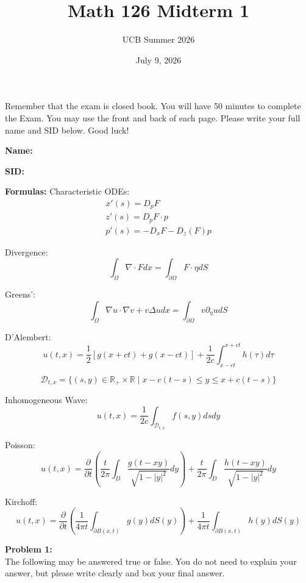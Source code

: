 \documentclass{article}
\newcommand{\R}{{\mathbb{R}}}
\newcommand{\pd}{\partial}
\begin{document}
\title{Math 126 Midterm 1}
\author{UCB Summer 2026}
\date{July 9, 2026}
\maketitle

Remember that the exam is closed book. You will have 50 minutes to complete the Exam. You may use the front and back of each page. Please write your full name and SID below. Good luck!


\textbf{Name:} 

\vspace{0.5 cm}

\textbf{SID:}

\vspace{1 cm}

\textbf{Formulas:}
Characteristic ODEs: 
\begin{align*}
	x'(s) = D_p F \\
	z'(s) = D_p F \cdot p \\
	p'(s) = -D_{x} F - D_{z}(F) p
\end{align*}

Divergence: $$\int_{\Omega} \nabla \cdot F dx = \int_{\pd \Omega} F \cdot \eta dS$$

Greens': $$\int_{\Omega} \nabla u \cdot \nabla v + v \Delta u dx = \int_{\pd \Omega} v \pd_{\eta}u dS$$

D'Alembert: $$u(t,x) = \frac{1}{2} \left[g(x+ct) + g(x-ct) \right] + \frac{1}{2c} \int_{x-ct}^{x+ct} h(\tau) d\tau $$

$$\mathcal{D}_{t,x} = \{ (s,y) \in \R_{+} \times \R \mid x-c(t-s) \leq y \leq x+c(t-s)\}$$

Inhomogeneous Wave: $$u(t,x) = \frac{1}{2c} \int_{\mathcal{D}_{t,x}} f(s,y) dsdy$$

Poisson: $$u(t,x) = \frac{\pd}{\pd t} \left( \frac{t}{2\pi} \int_{D} \frac{g(t-xy)}{\sqrt{1 - |y|^{2}}} dy\right) + \frac{t}{2\pi} \int_{D} \frac{h(t-xy)}{\sqrt{1-|y|^{2}}} dy$$

Kirchoff: $$ u(t,x) = \frac{\pd}{\pd t} \left(\frac{1}{4 \pi t} \int_{\pd B(x,t)} g(y) dS(y) \right) + \frac{1}{4\pi t} \int_{\pd B(x,t)} h(y) dS(y)$$






\newpage


\textbf{Problem 1:} \\

The following may be answered true or false. You do not need to explain your answer, but please write clearly and box your final answer. 
\end{document}
